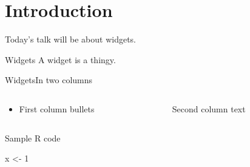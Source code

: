 
\subtitle{Optional subtitle}
\date{9 September 2011}
\author[Bloggs]{Prof.\ J.\ Bloggs}



\begin{frame}
\maketitle
\end{frame}


\section{Introduction}

Today's talk will be about widgets.  

\begin{frame}{Widgets}
A widget is a thingy.
\end{frame}

\begin{frame}{Widgets}{In two columns}
\begin{columns}[t]
\begin{column}{0.5\textwidth}
\begin{itemize}
\item First column bullets
\end{itemize}
\end{column}
\pause %
\begin{column}{0.5\textwidth}
Second column text \citep{Body2000}
\end{column}
\end{columns}
\end{frame}

\begin{frame}[fragile]{Sample R code}
\begin{rcode}
x <- 1
\end{rcode}
\end{frame}

